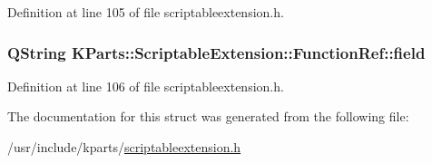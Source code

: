 \-Definition at line 105 of file scriptableextension.\-h.

\hypertarget{structKParts_1_1ScriptableExtension_1_1FunctionRef_a1e3cffbdcfde393b9ff6243080edbbd4}{
\subsubsection[{field}]{\setlength{\rightskip}{0pt plus 5cm}\-Q\-String {\bf \-K\-Parts\-::\-Scriptable\-Extension\-::\-Function\-Ref\-::field}}}\label{structKParts_1_1ScriptableExtension_1_1FunctionRef_a1e3cffbdcfde393b9ff6243080edbbd4}


\-Definition at line 106 of file scriptableextension.\-h.



\-The documentation for this struct was generated from the following file\-:\begin{DoxyCompactItemize}
\item 
/usr/include/kparts/\hyperlink{scriptableextension_8h}{scriptableextension.\-h}\end{DoxyCompactItemize}
